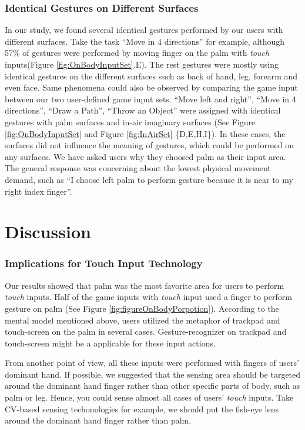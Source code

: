 \documentclass{sigchi}
\begin{document}
\subsubsection{Identical Gestures on Different Surfaces}
 In our study, we found several identical gestures performed by our users with different surfaces. Take the task ``Move in 4 directions'' for example, although 57\% of gestures were performed by moving finger on the palm with \emph{touch} inputs(Figure \ref{fig:OnBodyInputSet}.E). The rest gestures were mostly using identical gestures on the different surfaces such as back of hand, leg, forearm and even face. Same phenomena could also be observed by comparing the game input between our two user-defined game input sets. ``Move left and right'', ``Move in 4 directions'', ``Draw a Path'', ``Throw an Object'' were assigned with identical gestures with palm surfaces and in-air imaginary surfaces (See Figure \ref{fig:OnBodyInputSet} and Figure \ref{fig:InAirSet} \{D,E,H,I\}). In these cases, the surfaces did not influence the meaning of gestures, which could be performed on any surfaces. We have asked users why they choosed palm as their input area. The general response was concerning about the lowest physical movement demand, such as ``I choose left palm to perform gesture because it is near to my right index finger''. 

  \section{Discussion}

    \subsubsection{Implications for Touch Input Technology}
    Our results showed that palm was the most favorite area for users to perform \emph{touch} inputs. Half of the game inputs with \emph{touch} input used a finger to perform gesture on palm (See Figure \ref{fig:figureOnBodyPorpotion}). According to the mental model mentioned above, users utilized the metaphor of trackpad and touch-screen on the palm in several cases. Gesture-recognizer on trackpad and touch-screen might be a applicable for these input actions.

    From another point of view, all these inputs were performed with fingers of users' dominant hand. If possible, we suggested that the sensing area should be targeted around the dominant hand finger rather than other specific parts of body, such as palm or leg. Hence, you could sense almost all cases of users' \emph{touch} inputs. Take CV-based sensing techonologies for example, we should put the fish-eye lens around the dominant hand finger rather than palm.
\end{document}

